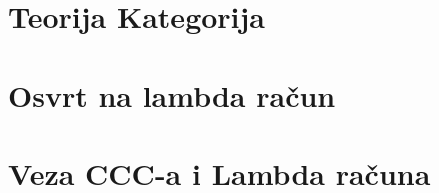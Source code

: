 \documentclass[ a4paper, 12pt]{report}
\theoremstyle{definition}
\numberwithin{Primjer}{chapter}
\begin{document}
%


%
%
\newpage
{} \setcounter{page}{1}
\tableofcontents
%
%

%
 \setcounter{page}{1}
%
%
\chapter{Teorija Kategorija}
%


%
%

\chapter{Osvrt na lambda račun}
%


\chapter{Veza CCC-a i Lambda računa}
%

\end{document}
